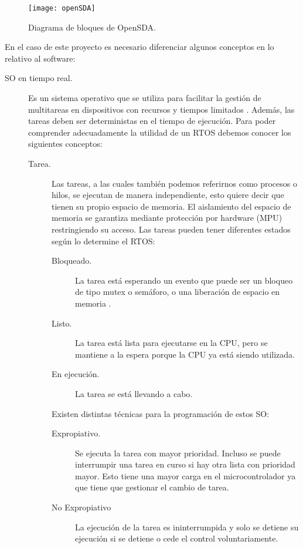 \begin{figure}[!h]
	\centering
	\texttt{[image: openSDA]}
	\caption{Diagrama de bloques de OpenSDA.}\label{OpenSDA}
\end{figure}

\clearpage

En el caso de este proyecto es necesario diferenciar algunos conceptos en lo relativo al software:

\begin{description}
\item[SO en tiempo real. \cite{SOTR} \label{ref:SOTiempoReal}] Es un sistema operativo que se utiliza para facilitar la gestión de multitareas en dispositivos con recursos y tiempos limitados \cite{SisTiempoReal}. Además, las tareas deben ser deterministas en el tiempo de ejecución. Para poder comprender adecuadamente la utilidad de un RTOS debemos conocer los siguientes conceptos:
\begin{description}
\item[Tarea.] Las tareas, a las cuales también podemos referirnos como procesos o hilos, se ejecutan de manera independiente, esto quiere decir que tienen su propio espacio de memoria. El aislamiento del espacio de memoria se garantiza mediante protección por hardware (MPU) restringiendo su acceso. Las tareas pueden tener diferentes estados según lo determine el RTOS:
	\begin{description}
		\item[Bloqueado.] La tarea está esperando un evento que puede ser un bloqueo de tipo mutex o semáforo, o una liberación de espacio en memoria .
		\item[Listo.] La tarea está lista para ejecutarse en la CPU, pero se mantiene a la espera porque la CPU ya está siendo utilizada.
		\item[En ejecución.] La tarea se está llevando a cabo.
	\end{description}
Existen distintas técnicas para la programación de estos SO:
	\begin{description}
		\item[Expropiativo.] Se ejecuta la tarea con mayor prioridad. Incluso se puede interrumpir una tarea en curso si hay otra lista con prioridad mayor. Esto tiene una mayor carga en el microcontrolador ya que tiene que gestionar el cambio de tarea.
		\item[No Expropiativo] La ejecución de la tarea es ininterrumpida y solo se detiene su ejecución si se detiene o cede el control voluntariamente.

\end{description}
\end{description}
\end{description}
